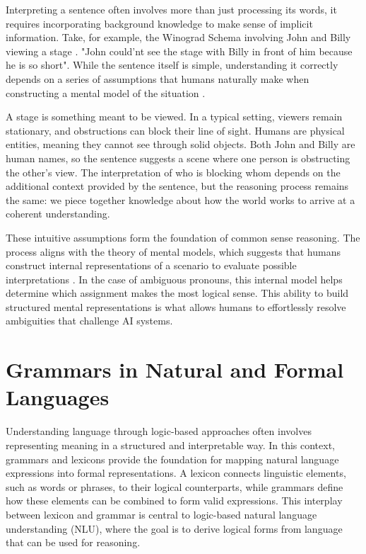 \documentclass[english,version-2020-11]{uzl-thesis}
\begin{document}
Interpreting a sentence often involves more than just processing its words, it requires incorporating background knowledge to make sense of implicit information. Take, for example, the Winograd Schema involving John and Billy viewing a stage \cite{Levesque2012}. 
"John could'nt see the stage with Billy in front of him because he is so short".
While the sentence itself is simple, understanding it correctly depends on a series of assumptions that humans naturally make when constructing a mental model of the situation \cite{Bayerkuhnlein2023}.

A stage is something meant to be viewed. In a typical setting, viewers remain stationary, and obstructions can block their line of sight. Humans are physical entities, meaning they cannot see through solid objects. Both John and Billy are human names, so the sentence suggests a scene where one person is obstructing the other’s view. The interpretation of who is blocking whom depends on the additional context provided by the sentence, but the reasoning process remains the same: we piece together knowledge about how the world works to arrive at a coherent understanding.

These intuitive assumptions form the foundation of common sense reasoning. The process aligns with the theory of mental models, which suggests that humans construct internal representations of a scenario to evaluate possible interpretations \cite{JohnsonLaird1989}. In the case of ambiguous pronouns, this internal model helps determine which assignment makes the most logical sense. This ability to build structured mental representations is what allows humans to effortlessly resolve ambiguities that challenge AI systems.

\section{Grammars in Natural and Formal Languages}

Understanding language through logic-based approaches often involves representing meaning in a structured and interpretable way. In this context, grammars and lexicons provide the foundation for mapping natural language expressions into formal representations. A lexicon connects linguistic elements, such as words or phrases, to their logical counterparts, while grammars define how these elements can be combined to form valid expressions. This interplay between lexicon and grammar is central to logic-based natural language understanding (NLU), where the goal is to derive logical forms from language that can be used for reasoning.
\end{document}
